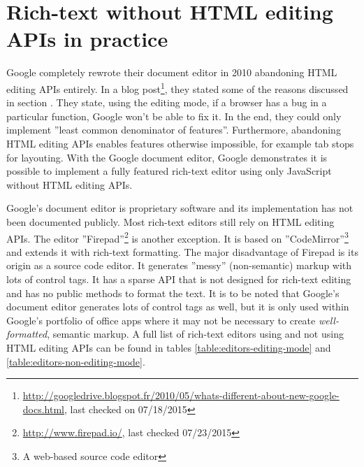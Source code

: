 \section{Rich-text without HTML editing APIs in practice} 

Google completely rewrote their document editor in 2010 abandoning HTML editing APIs entirely. In a blog post\footnote{\url{http://googledrive.blogspot.fr/2010/05/whats-different-about-new-google-docs.html}, last checked on 07/18/2015}, they stated some of the reasons discussed in section . They state, using the editing mode, if a browser has a bug in a particular function, Google won't be able to fix it. In the end, they could only implement ''least common denominator of features''. Furthermore, abandoning HTML editing APIs enables features otherwise impossible, for example tab stops for layouting\cite{bw}. With the Google document editor, Google demonstrates it is possible to implement a fully featured rich-text editor using only JavaScript without HTML editing APIs.




Google's document editor is proprietary software and its implementation has not been documented publicly. Most rich-text editors still rely on HTML editing APIs. The editor ''Firepad''\footnote{\url{http://www.firepad.io/}, last checked 07/23/2015} is another exception. It is based on ''CodeMirror''\footnote{A web-based source code editor} and extends it with rich-text formatting. The major disadvantage of Firepad is its origin as a source code editor. It generates ''messy'' (non-semantic) markup with lots of control tags. It has a sparse API that is not designed for rich-text editing and has no public methods to format the text. It is to be noted that Google's document editor generates lots of control tags as well, but it is only used within Google's portfolio of office apps where it may not be necessary to create \textit{well-formatted}, semantic markup. A full list of rich-text editors using and not using HTML editing APIs can be found in tables \ref{table:editors-editing-mode} and \ref{table:editors-non-editing-mode}. %


